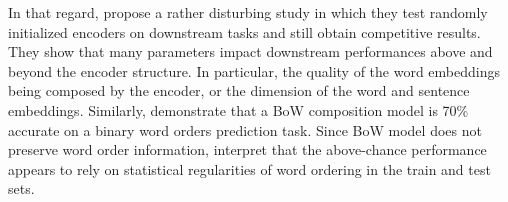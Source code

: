 In that regard, \textcite{wieting_19} propose a rather disturbing study in which they test randomly initialized encoders on downstream tasks and still obtain competitive results. They show that many parameters impact downstream performances above and beyond the encoder structure. In particular, the quality of the word embeddings being composed by the encoder, or the dimension of the word and sentence embeddings. Similarly, \textcite{adi_17} demonstrate that a BoW composition model is 70\% accurate on a binary word orders prediction task. Since BoW model does not preserve word order information, \textcite{ettinger_18} interpret that the above-chance performance appears to rely on statistical regularities of word ordering in the train and test sets.

\begin{table}[!htb]
\footnotesize
\end{table}
